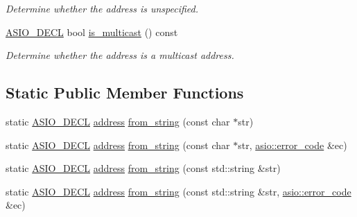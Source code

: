 \begin{DoxyCompactItemize}
\begin{DoxyCompactList}\small\item\em Determine whether the address is unspecified. \end{DoxyCompactList}\item 
\hyperlink{config_8hpp_ab54d01ea04afeb9a8b39cfac467656b7}{A\+S\+I\+O\+\_\+\+D\+E\+C\+L} bool \hyperlink{classasio_1_1ip_1_1address_a4e5b286321232ece60d526701bc0c98d}{is\+\_\+multicast} () const 
\begin{DoxyCompactList}\small\item\em Determine whether the address is a multicast address. \end{DoxyCompactList}\end{DoxyCompactItemize}
\subsection*{Static Public Member Functions}
\begin{DoxyCompactItemize}
\item 
static \hyperlink{config_8hpp_ab54d01ea04afeb9a8b39cfac467656b7}{A\+S\+I\+O\+\_\+\+D\+E\+C\+L} \hyperlink{classasio_1_1ip_1_1address}{address} \hyperlink{classasio_1_1ip_1_1address_a243a3c877143eff5cdf97a6b021febec}{from\+\_\+string} (const char $\ast$str)
\item 
static \hyperlink{config_8hpp_ab54d01ea04afeb9a8b39cfac467656b7}{A\+S\+I\+O\+\_\+\+D\+E\+C\+L} \hyperlink{classasio_1_1ip_1_1address}{address} \hyperlink{classasio_1_1ip_1_1address_a8f1b7afacd5f03088b6e9c9d3739ca45}{from\+\_\+string} (const char $\ast$str, \hyperlink{classasio_1_1error__code}{asio\+::error\+\_\+code} \&ec)
\item 
static \hyperlink{config_8hpp_ab54d01ea04afeb9a8b39cfac467656b7}{A\+S\+I\+O\+\_\+\+D\+E\+C\+L} \hyperlink{classasio_1_1ip_1_1address}{address} \hyperlink{classasio_1_1ip_1_1address_a205b9f051e45762098093de5c2385889}{from\+\_\+string} (const std\+::string \&str)
\item 
static \hyperlink{config_8hpp_ab54d01ea04afeb9a8b39cfac467656b7}{A\+S\+I\+O\+\_\+\+D\+E\+C\+L} \hyperlink{classasio_1_1ip_1_1address}{address} \hyperlink{classasio_1_1ip_1_1address_a8493221b73af6e13d8c5d7424a0bb56b}{from\+\_\+string} (const std\+::string \&str, \hyperlink{classasio_1_1error__code}{asio\+::error\+\_\+code} \&ec)
\end{DoxyCompactItemize}
